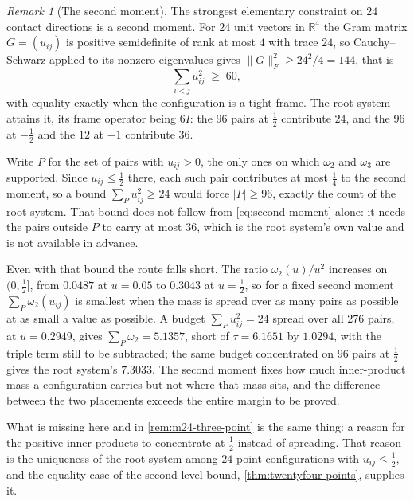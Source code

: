 \documentclass[11pt,reqno]{amsart}
\renewcommand{\_}{\origunderscore\allowbreak}
\numberwithin{equation}{section}
\theoremstyle{plain}
\theoremstyle{definition}
\theoremstyle{remark}
\newtheorem{remark}[thm]{Remark}
\begin{document}
\begin{remark}[The second moment]\label{rem:m24-remains}
The strongest elementary constraint on $24$ contact directions is a
second moment. For $24$ unit vectors
in $\mathbb{R}^4$ the Gram matrix $G=(u_{ij})$ is positive semidefinite
of rank at most $4$ with trace $24$, so Cauchy--Schwarz applied to its
nonzero eigenvalues gives $\|G\|_F^2\ge24^2/4=144$, that is
\begin{equation}\label{eq:second-moment}
  \sum_{i<j}u_{ij}^2\;\ge\;60,
\end{equation}
with equality exactly when the configuration is a tight frame. The root
system attains it, its frame operator being $6I$: the $96$ pairs at
$\tfrac12$ contribute $24$, and the $96$ at $-\tfrac12$ and the $12$ at
$-1$ contribute $36$.

Write $P$ for the set of pairs with $u_{ij}>0$, the only ones on which
$\omega_2$ and $\omega_3$ are supported. Since $u_{ij}\le\tfrac12$
there, each such pair contributes at most $\tfrac14$ to the second
moment, so a bound $\sum_Pu_{ij}^2\ge24$ would force $|P|\ge96$, exactly
the count of the root system. That bound does not follow from
\eqref{eq:second-moment} alone: it needs the pairs outside $P$ to carry
at most $36$, which is the root system's own value and is not available
in advance.

Even with that bound the route falls short. The ratio $\omega_2(u)/u^2$
increases on $(0,\tfrac12]$, from $0.0487$ at $u=0.05$ to $0.3043$ at
$u=\tfrac12$, so for a fixed second moment $\sum_P\omega_2(u_{ij})$ is
smallest when the mass is spread over as many pairs as possible at as
small a value as possible. A budget $\sum_Pu_{ij}^2=24$ spread over all
$276$ pairs, at $u=0.2949$, gives $\sum_P\omega_2=5.1357$, short of
$\tau=6.1651$ by $1.0294$, with the triple term still to be subtracted;
the same budget concentrated on $96$ pairs at $\tfrac12$ gives the root
system's $7.3033$. The second moment fixes how much inner-product mass a
configuration carries but not where that mass sits, and the difference
between the two placements exceeds the entire margin to be proved.

What is missing here and in \cref{rem:m24-three-point} is the same
thing: a reason for the positive inner products to concentrate at
$\tfrac12$ instead of spreading. That reason is the uniqueness of the
root system among $24$-point configurations with $u_{ij}\le\tfrac12$,
and the equality case of the second-level bound,
\cref{thm:twentyfour-points}, supplies it.
\end{remark}
\end{document}
